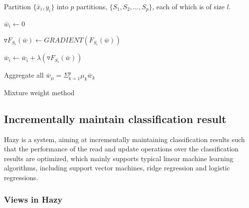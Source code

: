 \begin{algorithm}[h!] 
\footnotesize

 Partition $\{\bar{x}_i, y_i\}$ into $p$ partitions, $\{S_1, S_2,\dots, S_p\}$, each of which is of size $l$.
 
 {
    $\bar{w}_i \leftarrow 0$
    
    {
        $\triangledown F_{S_i}(\bar{w}) \leftarrow GRADIENT(F_{S_i}(\bar{w}))$
    
        $\bar{w}_i \leftarrow \bar{w}_i + \lambda(\triangledown F_{S_i}(\bar{w}))$
    }
 }
 
 Aggregate all $\bar{w}_{\mu} = \Sigma_{k=1}^p\mu_k\bar{w}_k$    
 
 \caption{Mixture weight method}
 \label{alg: mixture weight method}
 \end{algorithm}




\subsection{Incrementally maintain classification result}\label{sec: maintain_classification}
Hazy \cite{koc2011incrementally} is a system, aiming at incrementally maintaining classification results such that the performance of the read and update operations over the classification results are optimized, which mainly supports typical linear machine learning algorithms, including support vector machines, ridge regression and logistic regressions.

\subsubsection{Views in Hazy}



